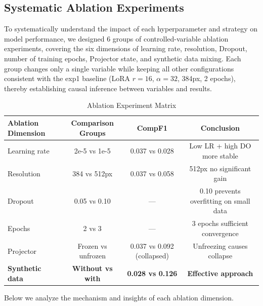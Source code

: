 \subsection{Systematic Ablation Experiments}

To systematically understand the impact of each hyperparameter and strategy on model performance, we designed 6 groups of controlled-variable ablation experiments, covering the six dimensions of learning rate, resolution, Dropout, number of training epochs, Projector state, and synthetic data mixing. Each group changes only a single variable while keeping all other configurations consistent with the exp1 baseline (LoRA $r=16$, $\alpha=32$, 384px, 2 epochs), thereby establishing causal inference between variables and results.

\begin{table}[h]
\centering
\caption{Ablation Experiment Matrix}
\begin{tabular}{lccc}
\toprule
\textbf{Ablation Dimension} & \textbf{Comparison Groups} & \textbf{CompF1} & \textbf{Conclusion} \\
\midrule
Learning rate       & 2e-5 vs 1e-5 & 0.037 vs 0.028 & Low LR + high DO more stable \\
Resolution          & 384 vs 512px  & 0.037 vs 0.058 & 512px no significant gain \\
Dropout             & 0.05 vs 0.10  & ---            & 0.10 prevents overfitting on small data \\
Epochs              & 2 vs 3        & ---            & 3 epochs sufficient convergence \\
Projector           & Frozen vs unfrozen & 0.037 vs 0.092 (collapsed) & Unfreezing causes collapse \\
\textbf{Synthetic data} & \textbf{Without vs with} & \textbf{0.028 vs 0.126} & \textbf{Effective approach} \\
\bottomrule
\end{tabular}
\end{table}

Below we analyze the mechanism and insights of each ablation dimension.

